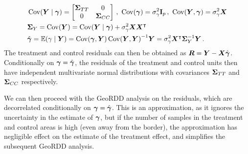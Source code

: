 \documentclass{article}
\begin{document}
\begin{equation}
    \begin{split}
        &
        \cov\del{\Yvec \mid \gammavec }
                = \begin{bmatrix}
                    \STT & 0 \\
                    0 & \SCC
                  \end{bmatrix}
            \,,\ 
            \cov\del{\gammavec} = \sigmabeta^2 \eye_p 
            \,,\  
            \cov\del{\Yvec, \gammavec} = \sigmabeta^2 \Xmat \\&
        \SigmaMat_Y = \cov\del{\Yvec} 
            = \cov\del{\Yvec \mid \gammavec}
                + \sigmabeta^2 \Xmat \Xmat\trans \\&
        \hat\gammavec 
            = \E\del{\gamma \mid \Yvec} 
            = \cov\del{\gammavec,\Yvec} \cov\del{\Yvec,\Yvec}^{-1} \Yvec
            = \sigmabeta^2 \Xmat\trans\SigmaMat_{Y}^{-1} \Yvec
        \,.
    \end{split}
\end{equation}
The treatment and control residuals can then be obtained as \(\bm{R} = \bm{Y} - \bm{X} \hat{\bm{\gamma}}\).
Conditionally on \(\bm{\gamma}=\hat{\bm{\gamma}}\), the residuals of the treatment and control units then have independent multivariate normal distributions with covariances \(\bm{\Sigma}_{T T}\) and \(\bm{\Sigma}_{C C}\) respectively.


We can then proceed with the GeoRDD analysis on the residuals, which are decorrelated conditionally on \(\bm{\gamma}=\hat{\bm{\gamma}}\).
This is an approximation, as it ignores the uncertainty in the estimate of \(\bm{\gamma}\), but if the number of samples in the treatment and control areas is high (even away from the border), the approximation has negligible effect on the estimate of the treatment effect, and simplifies the subsequent GeoRDD analysis.
\end{document}

